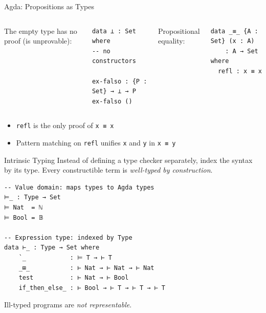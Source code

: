 \documentclass[10pt,compress,aspectratio=169]{beamer}
\begin{document}
\begin{frame}[fragile]{Agda: Propositions as Types}
  \begin{columns}[T]
      The empty type has no proof (is unprovable):
\begin{verbatim}
data ⊥ : Set where
-- no constructors

ex-falso : {P : Set} → ⊥ → P
ex-falso ()
\end{verbatim}

      Propositional equality:
\begin{verbatim}
data _≡_ {A : Set} (x : A)
    : A → Set where
  refl : x ≡ x
\end{verbatim}
  \end{columns}
  \bigskip
  \begin{itemize}
    \item \texttt{refl} is the only proof of \texttt{x ≡ x}
    \item Pattern matching on \texttt{refl} unifies \texttt{x} and \texttt{y} in \texttt{x ≡ y}
  \end{itemize}
\end{frame}

\begin{frame}[fragile]{Intrinsic Typing}
  Instead of defining a type checker separately, index the syntax by its type.
  Every constructible term is \emph{well-typed by construction}.

\begin{verbatim}
-- Value domain: maps types to Agda types
⊨_ : Type → Set
⊨ Nat  = ℕ
⊨ Bool = 𝔹

-- Expression type: indexed by Type
data ⊢_ : Type → Set where
    `_            : ⊨ T → ⊢ T
    _⊞_           : ⊢ Nat → ⊢ Nat → ⊢ Nat
    test          : ⊢ Nat → ⊢ Bool
    if_then_else_ : ⊢ Bool → ⊢ T → ⊢ T → ⊢ T
\end{verbatim}

  Ill-typed programs are \emph{not representable}.
\end{frame}
\end{document}
